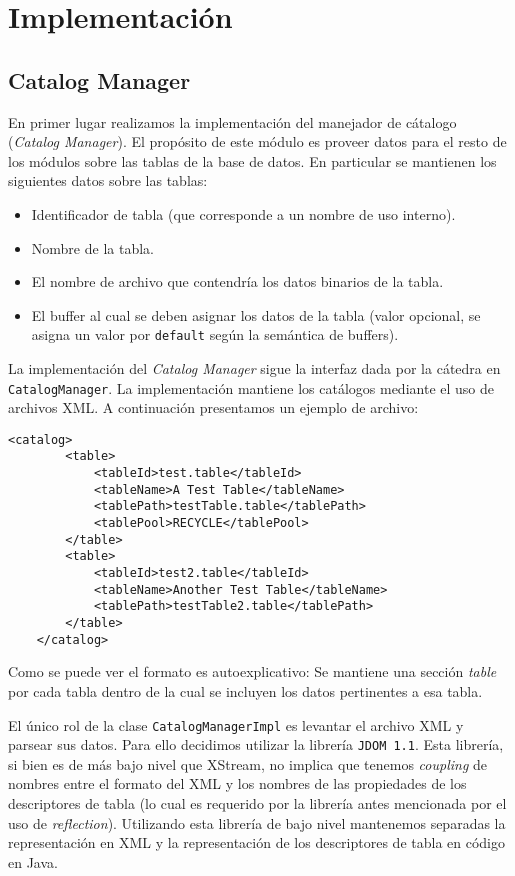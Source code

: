 \section{Implementaci\'on}

\subsection{Catalog Manager}

En primer lugar realizamos la implementaci\'on del manejador de c\'atalogo (\textit{Catalog Manager}). El propósito de este módulo es proveer datos para el resto de los módulos sobre las tablas de la base de datos. En particular se mantienen los siguientes datos sobre las tablas:

\begin{itemize}
	\item Identificador de tabla (que corresponde a un nombre de uso interno).
	\item Nombre de la tabla.
	\item El nombre de archivo que contendría los datos binarios de la tabla.
	\item El buffer al cual se deben asignar los datos de la tabla (valor opcional, se asigna un valor
	por \texttt{default} seg\'un la sem\'antica de buffers). 
\end{itemize}

La implementaci\'on del \textit{Catalog Manager} sigue la interfaz dada por la c\'atedra en \texttt{CatalogManager}. La implementaci\'on mantiene los cat\'alogos mediante el uso de archivos XML. A continuaci\'on presentamos un ejemplo de archivo:

\begin{Verbatim}[xleftmargin=-3em]
	<catalog>
		<table>
			<tableId>test.table</tableId>
			<tableName>A Test Table</tableName>
			<tablePath>testTable.table</tablePath>
			<tablePool>RECYCLE</tablePool>
		</table>
		<table>
			<tableId>test2.table</tableId>
			<tableName>Another Test Table</tableName>
			<tablePath>testTable2.table</tablePath>
		</table>
	</catalog>
\end{Verbatim}

Como se puede ver el formato es autoexplicativo: Se mantiene una secci\'on \textit{table} por cada tabla dentro de la cual se incluyen los datos pertinentes a esa tabla.

El único rol de la clase \texttt{CatalogManagerImpl} es levantar el archivo XML y parsear sus datos. Para ello decidimos utilizar la librer\'ia \texttt{JDOM 1.1}. Esta librer\'ia, si bien es de m\'as bajo nivel que XStream, no implica que tenemos \textit{coupling} de nombres entre el formato del XML y los nombres de las propiedades de los descriptores de tabla (lo cual es requerido por la librer\'ia antes mencionada por el uso de  \textit{reflection}). Utilizando esta librer\'ia de bajo nivel mantenemos separadas la representaci\'on en XML y la representaci\'on de los descriptores de tabla en c\'odigo en Java.

